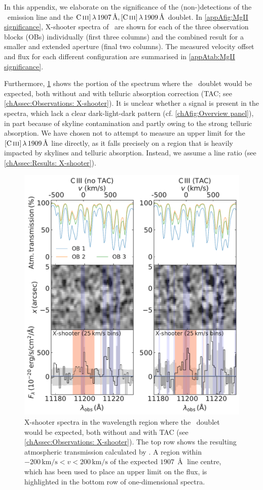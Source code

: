 In this appendix, we elaborate on the significance of the (non-)detections of the \MgII\ emission line and the $\CIIIs \, \lambda \, 1907 \, \Angstrom, \CIIIf \, \lambda \, 1909 \, \Angstrom$ doublet. In \cref{appAfig:MgII significance}, X-shooter spectra of \MgII\ are shown for each of the three observation blocks (OBs) individually (first three columns) and the combined result for a smaller and extended aperture (final two columns). The measured velocity offset and flux for each different configuration are summarised in \cref{appAtab:MgII significance}.

Furthermore, \cref{appAfig:CIII non-detection} shows the portion of the spectrum where the \CIII\ doublet would be expected, both without and with telluric absorption correction (TAC; see \cref{chAssec:Observations: X-shooter}). It is unclear whether a signal is present in the spectra, which lack a clear dark-light-dark pattern (cf. \cref{chAfig:Overview panel}), in part because of skyline contamination and partly owing to the strong telluric absorption. We have chosen not to attempt to measure an upper limit for the $\CIIIf \, \lambda \, 1909 \, \Angstrom$ line directly, as it falls precisely on a region that is heavily impacted by skylines and telluric absorption. Instead, we assume a line ratio (see \cref{chAssec:Results: X-shooter}).

\begin{figure}
    \centering
    \includegraphics[width=0.6\linewidth]{"Plots/ChapterA/CIII_nondetection"}
    \caption[Non-detections of \CIII]{X-shooter spectra in the wavelength region where the \CIII\ doublet would be expected, both without and with TAC (see \cref{chAssec:Observations: X-shooter}). The top row shows the resulting atmospheric transmission calculated by . A region within $-200 \,\mathrm{km/s} < v < 200 \, \mathrm{km/s}$ of the expected $1907 \, \Angstrom$ line centre, which has been used to place an upper limit on the flux, is highlighted in the bottom row of one-dimensional spectra.
    }
    \label{appAfig:CIII non-detection}
\end{figure}

